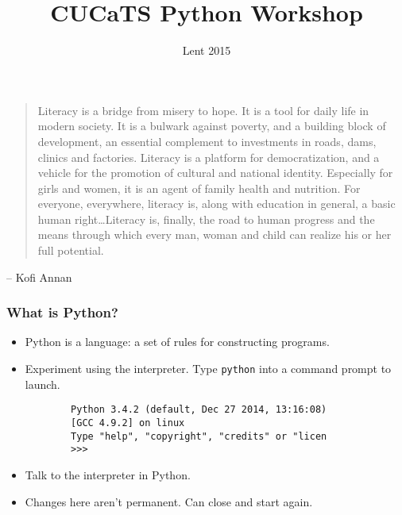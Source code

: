 \documentclass[notes]{beamer}
\title{CUCaTS Python Workshop}
\date{Lent 2015}
\begin{document}
\begin{frame}[fragile]
    \maketitle
\end{frame}

\begin{frame}[fragile]
    \begin{quotation}
        Literacy is a bridge from misery to hope. It is a tool for daily life in modern society. It is a bulwark against poverty, and a building block of development, an essential complement to investments in roads, dams, clinics and factories. Literacy is a platform for democratization, and a vehicle for the promotion of cultural and national identity. Especially for girls and women, it is an agent of family health and nutrition. For everyone, everywhere, literacy is, along with education in general, a basic human right\dots Literacy is, finally, the road to human progress and the means through which every man, woman and child can realize his or her full potential.
    \end{quotation}
\hfill  -- Kofi Annan
\end{frame}

\begin{frame}[fragile]
    \frametitle{What is Python?}
    \begin{itemize}
        \item Python is a language: a set of rules for constructing programs.
        \pause
        \item Experiment using the interpreter. Type \lstinline|python| into a command prompt to launch.
        \begin{lstlisting}
        Python 3.4.2 (default, Dec 27 2014, 13:16:08)
        [GCC 4.9.2] on linux
        Type "help", "copyright", "credits" or "licen
        >>>
        \end{lstlisting}
        \pause
        \item Talk to the interpreter in Python.
        \pause
        \item Changes here aren't permanent. Can close and start again.
    \end{itemize}
\end{frame}
\end{document}
